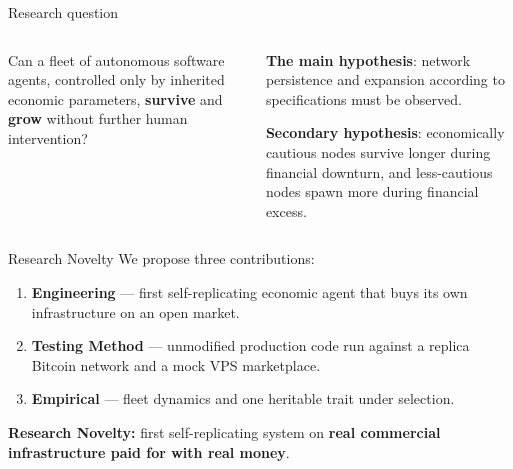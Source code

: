 {
  \setlength{\splitpos}{-0.55\paperwidth} %
  \rightfooterwhitetrue
  \begin{frame}{Research question}
    \begin{columns}[T]
      \begin{textcolumn}
        \large
        Can a fleet of autonomous software agents, controlled only by inherited economic parameters, \textbf{survive} and \textbf{grow} without further human
        intervention?
      \end{textcolumn}
      \begin{textcolumn}
          \color{white}
        \textbf{The main hypothesis}: network
        persistence and expansion according to specifications must be observed.\\

        \medskip

        \textbf{Secondary hypothesis}: economically cautious nodes survive longer during financial downturn, and less-cautious nodes spawn more during financial excess.
      \end{textcolumn}
    \end{columns}
  \end{frame}
}
\setlength{\splitpos}{0pt}\rightfooterwhitefalse %





{
\begin{frame}{Research Novelty}
    \small
    We propose three contributions:
      \begin{enumerate}
        \item \textbf{Engineering} --- first self-replicating economic agent that buys its own infrastructure on an open market.
        \item \textbf{Testing Method} --- unmodified production code run against a replica Bitcoin network and a mock VPS marketplace.
        \item \textbf{Empirical} --- fleet dynamics and one heritable trait under
          selection.
      \end{enumerate}

      \textcolor{tud Orange}{\textbf{Research Novelty:}} first self-replicating system on \textbf{real commercial infrastructure paid for with real money}.
\end{frame}
}
